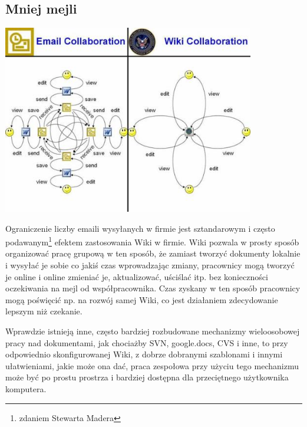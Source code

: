 \documentclass{article}
\begin{document}
	\subsection{Mniej mejli}
	\begin{center}
		\includegraphics[width=11cm]{screenshots/wiki_collaboration2.jpg}
	\end{center}
		Ograniczenie liczby emaili wysyłanych w firmie jest sztandarowym i często podawanym\footnote{zdaniem Stewarta Madera} efektem zastosowania Wiki w firmie. Wiki pozwala w prosty sposób organizować pracę grupową w ten sposób, że zamiast tworzyć dokumenty lokalnie i wysyłać je sobie co jakiś czas wprowadzając zmiany, pracownicy mogą tworzyć je online i online zmieniać je, aktualizować, uściślać itp. bez konieczności oczekiwania na mejl od współpracownika. Czas zyskany w ten sposób pracownicy mogą poświęcić np. na rozwój samej Wiki, co jest działaniem zdecydowanie lepszym niż czekanie.

		Wprawdzie istnieją inne, często bardziej rozbudowane mechanizmy wieloosobowej pracy nad dokumentami, jak chociażby SVN, google.docs, CVS i inne, to przy odpowiednio skonfigurowanej Wiki, z dobrze dobranymi szablonami i innymi ułatwieniami, jakie może ona dać, praca zespołowa przy użyciu tego mechanizmu może być po prostu prostrza i bardziej dostępna dla przeciętnego użytkownika komputera.


\end{document}
